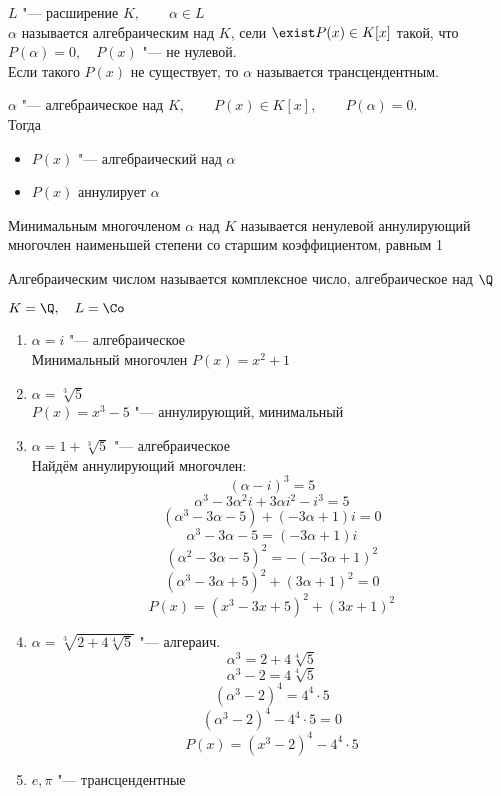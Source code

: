 \begin{definition}
	$ L $ "--- расширение $ K, \qquad \alpha \in L $ \\
	$ \alpha $ называется алгебраическим над $ K $, сели $ \exist P(x) \in K[x] $ такой, что $ P(\alpha) = 0, \quad P(x) $ "--- не нулевой. \\
	Если такого $ P(x) $ не существует, то $ \alpha $ называется трансцендентным.
\end{definition}

\begin{definition}
	$ \alpha $ "--- алгебраическое над $ K, \qquad P(x) \in K[x], \qquad P(\alpha) = 0 $. \\
	Тогда
	\begin{itemize}
		\item $ P(x) $ "--- алгебраический над $ \alpha $
		\item $ P(x) $ аннулирует $ \alpha $
	\end{itemize}
	Минимальным многочленом $ \alpha $ над $ K $ называется ненулевой аннулирующий многочлен наименьшей степени со старшим коэффициентом, равным 1
\end{definition}

\begin{definition}
	Алгебраическим числом называется комплексное число, алгебраическое над $ \Q $
\end{definition}

\begin{egs}
	$ K = \Q, \quad L = \Co $
	\begin{enumerate}
		\item $ \alpha = i $ "--- алгебраическое \\
		Минимальный многочлен $ P(x) = x^2 + 1 $
		\item $ \alpha = \sqrt[3]5 $ \\
		$ P(x) = x^3 - 5 $ "--- аннулирующий, минимальный
		\item $ \alpha = 1 + \sqrt[3]5 $ "--- алгебраическое \\
		Найдём аннулирующий многочлен:
		$$ (\alpha - i)^3 = 5 $$
		$$ \alpha^3 - 3\alpha^2i + 3\alpha i^2 - i^3 = 5 $$
		$$ (\alpha^3 - 3\alpha - 5) + (-3\alpha + 1)i = 0 $$
		$$ \alpha^3 - 3\alpha - 5 = (-3\alpha + 1)i $$
		$$ (\alpha^2 - 3\alpha - 5)^2 = -(-3\alpha + 1)^2 $$
		$$ (\alpha^3 - 3\alpha + 5)^2 + (3\alpha + 1)^2 = 0 $$
		$$ P(x) = (x^3 - 3x + 5)^2 + (3x + 1)^2 $$
		\item $ \alpha = \sqrt[3]{2 + 4\sqrt[4]5} $ "--- алгераич.
		$$ \alpha^3 = 2 + 4\sqrt[4]5 $$
		$$ \alpha^3 - 2 = 4\sqrt[4]5 $$
		$$ (\alpha^3 - 2)^4 = 4^4 \cdot 5 $$
		$$ (\alpha^3 - 2)^4 - 4^4 \cdot 5 = 0 $$
		$$ P(x) = (x^3 - 2)^4 - 4^4 \cdot 5 $$
		\item $ e, \pi $ "--- трансцендентные
	\end{enumerate}
\end{egs}

